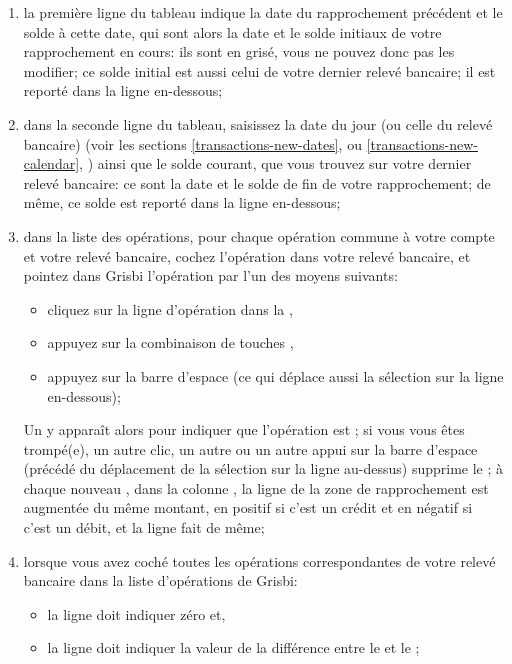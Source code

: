 \begin{enumerate}
	\item la première ligne du tableau indique la date du rapprochement précédent et le solde à cette date, qui sont alors la date et le solde initiaux de votre rapprochement en cours: ils sont en grisé, vous ne pouvez donc pas les modifier; ce solde initial est aussi celui de votre dernier relevé bancaire; il est reporté dans la ligne  en-dessous;
	\item dans la seconde ligne du tableau, saisissez la date du jour (ou celle du relevé bancaire) (voir les sections \vref{transactions-new-dates},  ou \vref{transactions-new-calendar}, ) ainsi que le solde courant, que vous trouvez sur votre dernier relevé bancaire: ce sont la date et le solde de fin de votre rapprochement; de même, ce solde est reporté dans la ligne  en-dessous;
	\item dans la liste des opérations, pour chaque opération commune à votre compte et votre relevé bancaire, cochez l'opération dans votre relevé bancaire, et pointez dans Grisbi l'opération par l'un des moyens suivants:
		\begin{itemize}
			\item cliquez sur la ligne d'opération dans la  ,
			\item appuyez sur la combinaison de touches ,
			\item appuyez sur la barre d'espace (ce qui déplace aussi la sélection sur la ligne en-dessous);			
		\end{itemize}	 
	Un  y apparaît alors pour indiquer que l'opération est ; si vous vous êtes trompé(e), un autre clic, un autre  ou un autre appui sur la barre d'espace (précédé du déplacement de la sélection sur la ligne au-dessus) supprime le ; à chaque nouveau , dans la colonne , la ligne  de la zone de rapprochement est augmentée du même montant, en positif si c'est un crédit et en négatif si c'est un débit, et la ligne  fait de même;
	\item lorsque vous avez coché toutes les opérations correspondantes de votre relevé bancaire dans la liste d'opérations de Grisbi:
	\begin{itemize}
		\item la ligne  doit indiquer zéro et,
		\item la ligne  doit indiquer la valeur de la différence entre le  et le ;

\end{itemize}
\end{enumerate}
